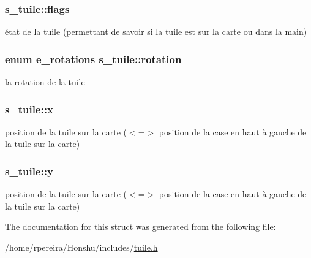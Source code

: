 \subsubsection[{\texorpdfstring{flags}{flags}}]{ s\+\_\+tuile\+::flags}\hypertarget{structs__tuile_a5d69c62cf0466ef19df55fbdb855d72d}{}\label{structs__tuile_a5d69c62cf0466ef19df55fbdb855d72d}
état de la tuile (permettant de savoir si la tuile est sur la carte ou dans la main) 
\subsubsection[{\texorpdfstring{rotation}{rotation}}]{\setlength{\rightskip}{0pt plus 5cm}enum {\bf e\+\_\+rotations} s\+\_\+tuile\+::rotation}\hypertarget{structs__tuile_a750c160d0579f887c8a1cd69b562a5c5}{}\label{structs__tuile_a750c160d0579f887c8a1cd69b562a5c5}
la rotation de la tuile 
\subsubsection[{\texorpdfstring{x}{x}}]{ s\+\_\+tuile\+::x}\hypertarget{structs__tuile_ae907b0e7060b9bba022b58b33865fe99}{}\label{structs__tuile_ae907b0e7060b9bba022b58b33865fe99}
position de la tuile sur la carte ($<$=$>$ position de la case en haut à gauche de la tuile sur la carte) 
\subsubsection[{\texorpdfstring{y}{y}}]{ s\+\_\+tuile\+::y}\hypertarget{structs__tuile_a0f1e6c057219c80008d690c809d75258}{}\label{structs__tuile_a0f1e6c057219c80008d690c809d75258}
position de la tuile sur la carte ($<$=$>$ position de la case en haut à gauche de la tuile sur la carte) 

The documentation for this struct was generated from the following file\+:\begin{DoxyCompactItemize}
\item 
/home/rpereira/\+Honshu/includes/\hyperlink{tuile_8h}{tuile.\+h}\end{DoxyCompactItemize}
